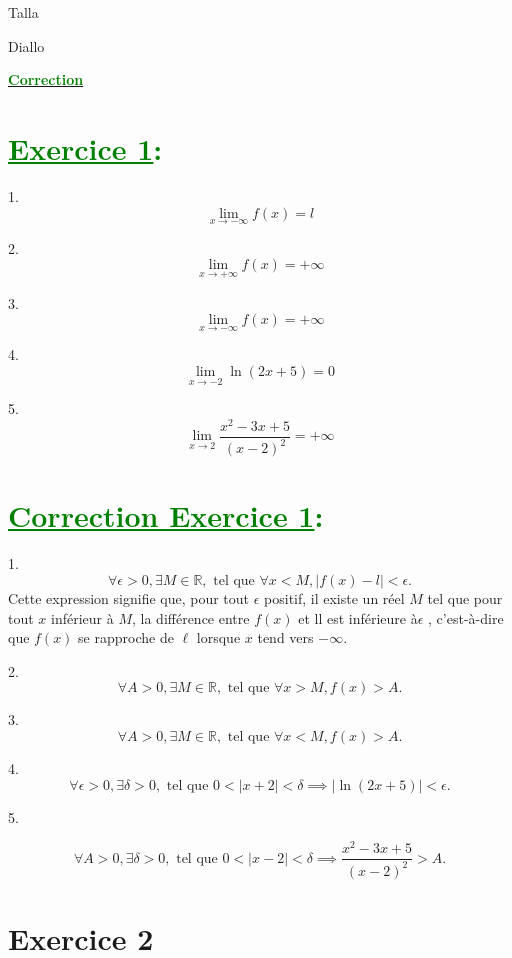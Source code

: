 \documentclass[12pt]{article}
\begin{document}
\begin{minipage}{0.8\textwidth}
	Talla                        
\end{minipage}
\begin{minipage}{0.8\textwidth}
	Diallo 
\end{minipage}

\begin{center}
\textbf{{\underline{\textcolor{green}{Correction}}}}
\end{center}
\section*{\textcolor{green}{\underline{Exercice 1}:}}

1. \[\lim_{x \to -\infty} f(x) = l\]

2. \[\lim_{x \to +\infty} f(x) = +\infty\]

3. \[\lim_{x \to -\infty} f(x) = +\infty\]

4. \[\lim_{x \to -2} \ln(2x+5) = 0\]

5. \[\lim_{x \to 2} \frac{x^{2}-3x+5}{(x-2)^{2}} = +\infty\]
\section*{\textcolor{green}{\underline{Correction Exercice 1}:}}
1. 
\[
\forall \epsilon > 0, \exists M \in \mathbb{R}, \text{ tel que } \forall x < M, |f(x) - l| < \epsilon.
\]
Cette expression signifie que, pour tout $\epsilon$ positif, il existe un réel $M$ tel que pour tout $x$ inférieur à $M$, la différence entre $f(x)$ et ll est inférieure à$\epsilon$ , c'est-à-dire que $f(x)$ se rapproche de $\ell$ lorsque $x$ tend vers $-\infty$.

2.
\[
\forall A > 0, \exists M \in \mathbb{R}, \text{ tel que } \forall x > M, f(x) > A.
\]


3. 
\[
\forall A > 0, \exists M \in \mathbb{R}, \text{ tel que } \forall x < M, f(x) > A.
\]


4. 
\[
\forall \epsilon > 0, \exists \delta > 0, \text{ tel que } 0 < |x + 2| < \delta \implies |\ln(2x+5)| < \epsilon.
\]


5. 

\[
\forall A > 0, \exists \delta > 0, \text{ tel que } 0 < |x - 2| < \delta \implies \frac{x^{2}-3x+5}{(x-2)^{2}} > A.
\]

\section*{Exercice 2}
\end{document}
